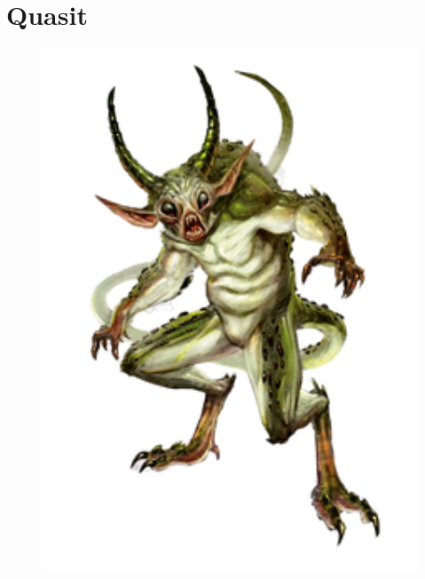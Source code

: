 \documentclass[oneside]{clgrammar}
\begin{document}
\section{Quasit}
\begin{figure}[h!]
\centering
\includegraphics[width=350pt]{images/monstros/quasit-removebg-preview.png}
\end{figure}

\newpage
\end{document}
